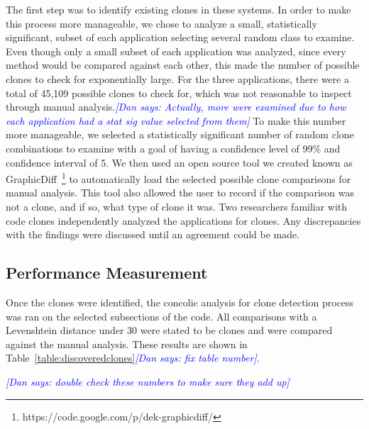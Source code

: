 \documentclass{sig-alternate}
\newcommand{\dan}[1]{\textcolor{blue}{{\it [Dan says: #1]}}}
\begin{document}
The first step was to identify existing clones in these systems. In order to make this process more manageable, we chose to analyze a small, statistically significant, subset of each application selecting several random class to examine. Even though only a small subset of each application was analyzed, since every method would be compared against each other, this made the number of possible clones to check for exponentially large. For the three applications, there were a total of 45,109 possible clones to check for, which was not reasonable to inspect through manual analysis.\dan{Actually, more were examined due to how each application had a stat sig value selected from them} To make this number more manageable, we selected a statistically significant number of random clone combinations to examine with a goal of having a confidence level of 99\% and confidence interval of 5. We then used an open source tool we created known as GraphicDiff~\footnote{https://code.google.com/p/dek-graphicdiff/} to automatically load the selected possible clone comparisons for manual analysis. This tool also allowed the user to record if the comparison was not a clone, and if so, what type of clone it was. Two researchers familiar with code clones independently analyzed the applications for clones. Any discrepancies with the findings were discussed until an agreement could be made.  

\subsection{Performance Measurement}


Once the clones were identified, the concolic analysis for clone detection process was ran on the selected subsections of the code. All comparisons with a Levenshtein distance under 30 were stated to be clones and were compared against the manual analysis. These results are shown in Table~\ref{table:discoveredclones}\dan{fix table number}.




\dan{double check these numbers to make sure they add up}


\end{document}
